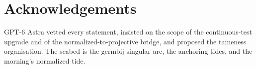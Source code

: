 \documentclass[11pt]{article}
\begin{document}
\section*{Acknowledgements}

GPT-6 Astra vetted every statement, insisted on the scope of the
continuous-test upgrade and of the normalized-to-projective bridge, and
proposed the tameness organisation. The seabed is the germbij singular
arc, the anchoring tides, and the morning's normalized tide.
\end{document}
